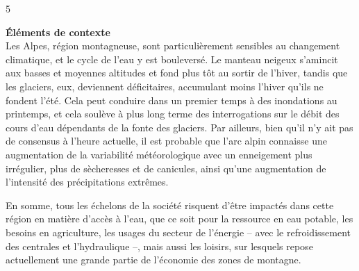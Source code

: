 \begin{spacing}{5}
~
\end{spacing}


{\noindent\Large\textbf{Éléments de contexte}}
\\

Les Alpes, région montagneuse, sont particulièrement sensibles au changement climatique, et le cycle de l’eau y est bouleversé. Le manteau neigeux s’amincit aux basses et moyennes altitudes et fond plus tôt au sortir de l’hiver, tandis que les glaciers, eux, deviennent déficitaires, accumulant moins l’hiver qu’ils ne fondent l’été. Cela peut conduire dans un premier temps à des inondations au printemps, et cela soulève à plus long terme des interrogations sur le débit des cours d’eau dépendants de la fonte des glaciers. Par ailleurs, bien qu’il n’y ait pas de consensus à l’heure actuelle, il est probable que l’arc alpin connaisse une augmentation de la variabilité météorologique avec un enneigement plus irrégulier, plus de sècheresses et de canicules, ainsi qu’une augmentation de l’intensité des précipitations extrêmes.

En somme, tous les échelons de la société risquent d’être impactés dans cette région en matière d’accès à l’eau, que ce soit pour la ressource en eau potable, les besoins en agriculture, les usages du secteur de l’énergie – avec le refroidissement des centrales et l’hydraulique –, mais aussi les loisirs, sur lesquels repose actuellement une grande partie de l’économie des zones de montagne.

\vspace*{\fill}



